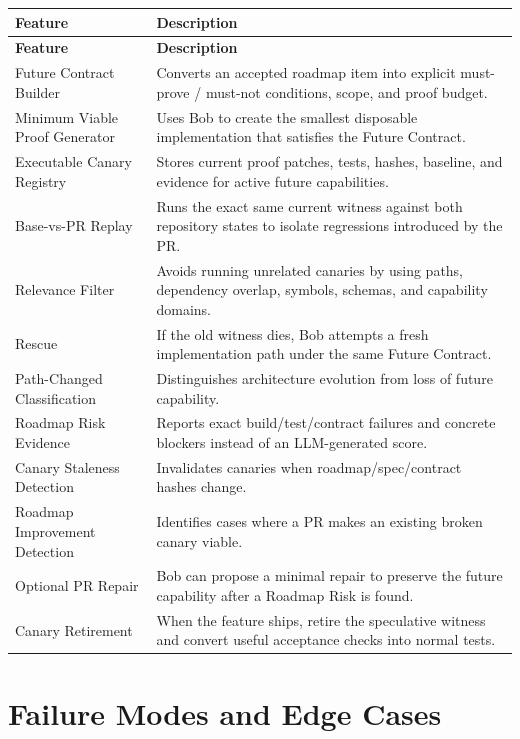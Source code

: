 \documentclass[12pt]{article}
\begin{document}
\begin{longtable}{p{}p{}}
\toprule
\textbf{Feature} & \textbf{Description} \\
\midrule
\endfirsthead
\toprule
\textbf{Feature} & \textbf{Description} \\
\midrule
\endhead
Future Contract Builder & Converts an accepted roadmap item into explicit must-prove / must-not conditions, scope, and proof budget. \\
\addlinespace
Minimum Viable Proof Generator & Uses Bob to create the smallest disposable implementation that satisfies the Future Contract. \\
\addlinespace
Executable Canary Registry & Stores current proof patches, tests, hashes, baseline, and evidence for active future capabilities. \\
\addlinespace
Base-vs-PR Replay & Runs the exact same current witness against both repository states to isolate regressions introduced by the PR. \\
\addlinespace
Relevance Filter & Avoids running unrelated canaries by using paths, dependency overlap, symbols, schemas, and capability domains. \\
\addlinespace
Rescue & If the old witness dies, Bob attempts a fresh implementation path under the same Future Contract. \\
\addlinespace
Path-Changed Classification & Distinguishes architecture evolution from loss of future capability. \\
\addlinespace
Roadmap Risk Evidence & Reports exact build/test/contract failures and concrete blockers instead of an LLM-generated score. \\
\addlinespace
Canary Staleness Detection & Invalidates canaries when roadmap/spec/contract hashes change. \\
\addlinespace
Roadmap Improvement Detection & Identifies cases where a PR makes an existing broken canary viable. \\
\addlinespace
Optional PR Repair & Bob can propose a minimal repair to preserve the future capability after a Roadmap Risk is found. \\
\addlinespace
Canary Retirement & When the feature ships, retire the speculative witness and convert useful acceptance checks into normal tests. \\
\bottomrule
\end{longtable}

\section{Failure Modes and Edge Cases}
\end{document}
